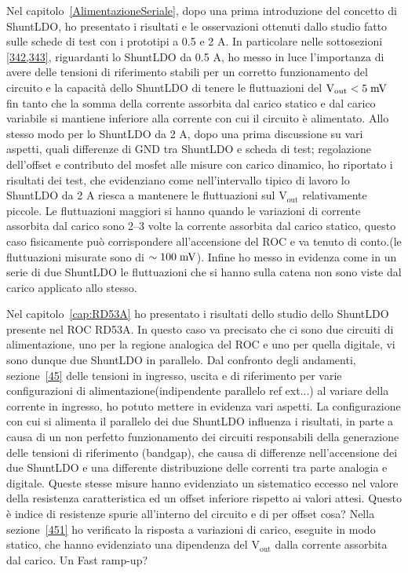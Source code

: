 Nel capitolo~\ref{AlimentazioneSeriale}, dopo una prima introduzione del concetto di ShuntLDO, ho presentato i risultati e le osservazioni ottenuti dallo studio fatto sulle schede di test con i prototipi a 0.5 e 2 A. 
In particolare nelle sottosezioni \ref{342,343}, riguardanti lo ShuntLDO da 0.5 A, ho messo in luce l'importanza di avere delle tensioni di riferimento stabili per un corretto funzionamento del circuito e la capacità dello ShuntLDO di tenere le fluttuazioni del $\mathrm{V_{out}<5 \rm \; mV}$ fin tanto che la somma della corrente assorbita dal carico statico e dal carico variabile si mantiene inferiore alla corrente con cui il circuito è alimentato. 
Allo stesso modo per lo ShuntLDO da 2 A, dopo una prima discussione su vari aspetti, quali differenze di GND tra ShuntLDO e scheda di test; regolazione dell'offset e contributo del mosfet alle misure con carico dinamico, ho riportato i risultati dei test, che evidenziano come nell'intervallo tipico di lavoro lo ShuntLDO da 2 A riesca a mantenere le fluttuazioni sul $\mathrm{V_{out}}$ relativamente piccole. 
Le fluttuazioni maggiori si hanno quando le variazioni di corrente assorbita dal carico sono 2--3 volte la corrente assorbita dal carico statico, questo caso fisicamente può corrispondere all'accensione del ROC e va tenuto di conto.(le fluttuazioni misurate sono di $\sim 100 \rm \; mV$). 
Infine ho messo in evidenza come in un serie di due ShuntLDO le fluttuazioni che si hanno sulla catena non sono viste dal carico applicato allo stesso.

Nel capitolo~\ref{cap:RD53A} ho presentato i risultati dello studio dello ShuntLDO presente nel ROC RD53A. In questo caso va precisato che ci sono due circuiti di alimentazione, uno per la regione analogica del ROC e uno per quella digitale, vi sono dunque due ShuntLDO in parallelo. 
Dal confronto degli andamenti, sezione~\ref{45} delle tensioni in ingresso, uscita e di riferimento per varie configurazioni di alimentazione(indipendente parallelo ref ext...) al variare della corrente in ingresso, ho potuto mettere in evidenza vari aspetti. 
La configurazione con cui si alimenta il parallelo dei due ShuntLDO influenza i risultati, in parte a causa di un non perfetto funzionamento dei circuiti responsabili della generazione delle tensioni di riferimento (bandgap), che causa di differenze nell'accensione dei due ShuntLDO e una differente distribuzione delle correnti tra parte analogia e digitale. 
Queste stesse misure hanno evidenziato un sistematico eccesso nel valore della resistenza caratteristica ed un offset inferiore  rispetto ai valori attesi. 
Questo è indice di resistenze spurie all'interno del circuito e di per offset cosa? 
Nella sezione~\ref{451} ho verificato la risposta a variazioni di carico, eseguite in modo statico, che hanno evidenziato una dipendenza del $\mathrm{V_{out}}$ dalla corrente assorbita dal carico. 
Un
Fast ramp-up?

